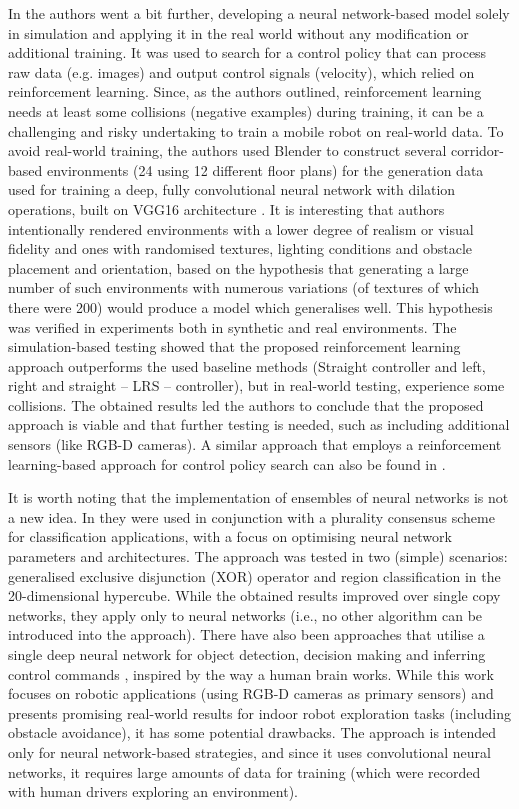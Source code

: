 In \cite{Sadeghi2016} the authors went a bit further, developing a neural network-based model solely in simulation and applying it in the real world without any modification or additional training. It was used to search for a control policy that can process raw data (e.g. images) and output control signals (velocity), which relied on reinforcement learning. Since, as the authors outlined, reinforcement learning needs at least some collisions (negative examples) during training, it can be a challenging and risky undertaking to train a mobile robot on real-world data. To avoid real-world training, the authors used Blender \cite{Blender2018} to construct several corridor-based environments (24 using 12 different floor plans) for the generation data used for training a deep, fully convolutional neural network with dilation operations, built on VGG16 architecture \cite{Simonyan2014}. It is interesting that authors intentionally rendered environments with a lower degree of realism or visual fidelity and ones with randomised textures, lighting conditions and obstacle placement and orientation, based on the hypothesis that generating a large number of such environments with numerous variations (of textures of which there were 200) would produce a model which generalises well. This hypothesis was verified in experiments both in synthetic and real environments. The simulation-based testing showed that the proposed reinforcement learning approach outperforms the used baseline methods (Straight controller and left, right and straight -- LRS -- controller), but in real-world testing, experience some collisions. The obtained results led the authors to conclude that the proposed approach is viable and that further testing is needed, such as including additional sensors (like RGB-D cameras). A similar approach that employs a reinforcement learning-based approach for control policy search can also be found in \cite{Zhang2015}.

It is worth noting that the implementation of ensembles of neural networks is not a new idea. In \cite{Hansen1990} they were used in conjunction with a plurality consensus scheme for classification applications, with a focus on optimising neural network parameters and architectures. The approach was tested in two (simple) scenarios: generalised exclusive disjunction (XOR) operator and region classification in the 20-dimensional hypercube. While the obtained results improved over single copy networks, they apply only to neural networks (i.e., no other algorithm can be introduced into the approach). There have also been approaches that utilise a single deep neural network for object detection, decision making and inferring control commands \cite{Tai2017}, inspired by the way a human brain works. While this work focuses on robotic applications (using RGB-D cameras as primary sensors) and presents promising real-world results for indoor robot exploration tasks (including obstacle avoidance), it has some potential drawbacks. The approach \cite{Tai2017} is intended only for neural network-based strategies, and since it uses convolutional neural networks, it requires large amounts of data for training (which were recorded with human drivers exploring an environment).

